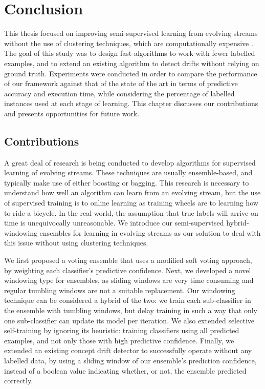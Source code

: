 
\chapter{Conclusion\label{chapter:conclusion}} %


This thesis focused on improving semi-supervised learning from evolving streams without the use of clustering techniques, which are computationally expensive \cite{krempl2014open}. The goal of this study was to design fast algorithms to work with fewer labelled examples, and to extend an existing algorithm to detect drifts without relying on ground truth. Experiments were conducted in order to compare the performance of our framework against that of the state of the art in terms of predictive accuracy and execution time, while considering the percentage of labelled instances used at each stage of learning. This chapter discusses our contributions and presents opportunities for future work.

 
\section{Contributions}
A great deal of research is being conducted to develop algorithms for supervised learning of evolving streams. These techniques are usually ensemble-based, and typically make use of either boosting or bagging. This research is necessary to understand how well an algorithm can learn from an evolving stream, but the use of supervised training is to online learning as training wheels are to learning how to ride a bicycle. In the real-world, the assumption that true labels will arrive on time is unequivocally unreasonable. We introduce our semi-supervised hybrid-windowing ensembles for learning in evolving streams as our solution to deal with this issue without using clustering techniques.

We first proposed a voting ensemble that uses a modified soft voting approach, by weighting each classifier’s predictive confidence. Next, we developed a novel windowing type for ensembles, as sliding windows are very time consuming and regular tumbling windows are not a suitable replacement. Our windowing technique can be considered a hybrid of the two: we train each sub-classifier in the ensemble with tumbling windows, but delay training in such a way that only one sub-classifier can update its model per iteration. We also extended selective self-training by ignoring its heuristic: training classifiers using all predicted examples, and not only those with high predictive confidence. Finally, we extended an existing concept drift detector to successfully operate without any labelled data, by using a sliding window of our ensemble’s prediction confidence, instead of a boolean value indicating whether, or not, the ensemble predicted correctly.

